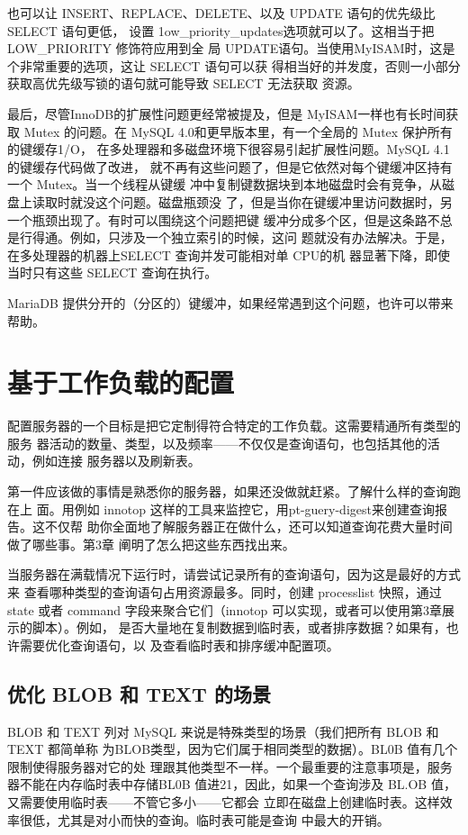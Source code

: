 也可以让 INSERT、REPLACE、DELETE、以及 UPDATE 语句的优先级比 SELECT 语句更低，
设置 1ow\_priority\_updates选项就可以了。这相当于把LOW\_PRIORITY 修饰符应用到全
局 UPDATE语句。当使用MyISAM时，这是个非常重要的选项，这让 SELECT 语句可以获
得相当好的并发度，否则一小部分获取高优先级写锁的语句就可能导致 SELECT 无法获取
资源。

最后，尽管InnoDB的扩展性问题更经常被提及，但是 MyISAM一样也有长时间获取
Mutex 的问题。在 MySQL 4.0和更早版本里，有一个全局的 Mutex 保护所有的键缓存1/O，
在多处理器和多磁盘环境下很容易引起扩展性问题。MySQL 4.1 的键缓存代码做了改进，
就不再有这些问题了，但是它依然对每个键缓冲区持有一个 Mutex。当一个线程从键缓
冲中复制键数据块到本地磁盘时会有竞争，从磁盘上读取时就没这个问题。磁盘瓶颈没
了，但是当你在键缓冲里访问数据时，另一个瓶颈出现了。有时可以围绕这个问题把键
缓冲分成多个区，但是这条路不总是行得通。例如，只涉及一个独立索引的时候，这问
题就没有办法解决。于是，在多处理器的机器上SELECT 查询并发可能相对单 CPU的机
器显著下降，即使当时只有这些 SELECT 查询在执行。

MariaDB 提供分开的（分区的）键缓冲，如果经常遇到这个问题，也许可以带来帮助。
\section{基于工作负载的配置}
配置服务器的一个目标是把它定制得符合特定的工作负载。这需要精通所有类型的服务
器活动的数量、类型，以及频率——不仅仅是查询语句，也包括其他的活动，例如连接
服务器以及刷新表。

第一件应该做的事情是熟悉你的服务器，如果还没做就赶紧。了解什么样的查询跑在上
面。用例如 innotop 这样的工具来监控它，用pt-guery-digest来创建查询报告。这不仅帮
助你全面地了解服务器正在做什么，还可以知道查询花费大量时间做了哪些事。第3章
阐明了怎么把这些东西找出来。

当服务器在满载情况下运行时，请尝试记录所有的查询语句，因为这是最好的方式来
查看哪种类型的查询语句占用资源最多。同时，创建 processlist 快照，通过state 或者
command 字段来聚合它们（innotop 可以实现，或者可以使用第3章展示的脚本）。例如，
是否大量地在复制数据到临时表，或者排序数据？如果有，也许需要优化查询语句，以
及查看临时表和排序缓冲配置项。

\subsection{优化 BLOB 和 TEXT 的场景}
BLOB 和 TEXT 列对 MySQL 来说是特殊类型的场景（我们把所有 BLOB 和 TEXT 都简单称
为BLOB类型，因为它们属于相同类型的数据）。BL0B 值有几个限制使得服务器对它的处
理跟其他类型不一样。一个最重要的注意事项是，服务器不能在内存临时表中存储BL0B
值进21，因此，如果一个查询涉及 BL.OB 值，又需要使用临时表——不管它多小——它都会
立即在磁盘上创建临时表。这样效率很低，尤其是对小而快的查询。临时表可能是查询
中最大的开销。

